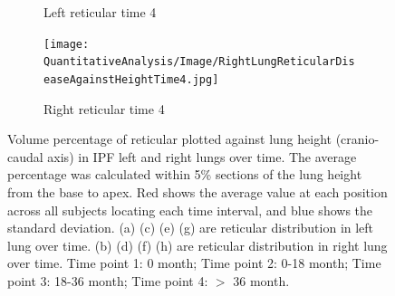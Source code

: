 \begin{figure}[H]
\begin{subfigure}{.41\linewidth}
  \caption{Left reticular time 4}
  \label{fig:DiseaseAgainstHeightOverTime2-g} 
\end{subfigure} 
\begin{subfigure}{.41\linewidth}%
  \texttt{[image: QuantitativeAnalysis/Image/RightLungReticularDiseaseAgainstHeightTime4.jpg]}
  \caption{Right reticular time 4}
  \label{fig:DiseaseAgainstHeightOverTime2-h}
\end{subfigure}
\caption{Volume percentage of reticular plotted against lung height (cranio-caudal axis) in IPF left and right lungs over time. The average percentage was calculated within 5\% sections of the lung height from the base to apex. Red shows the average value at each position across all subjects locating each time interval, and blue shows the standard deviation. (a) (c) (e) (g) are reticular distribution in left lung over time. (b) (d) (f) (h) are reticular distribution in right lung over time. Time point 1: 0 month; Time point 2: 0-18 month; Time point 3: 18-36 month; Time point 4: $>$ 36 month.}
\label{fig:DiseaseAgainstHeightOverTime2}
\end{figure}

